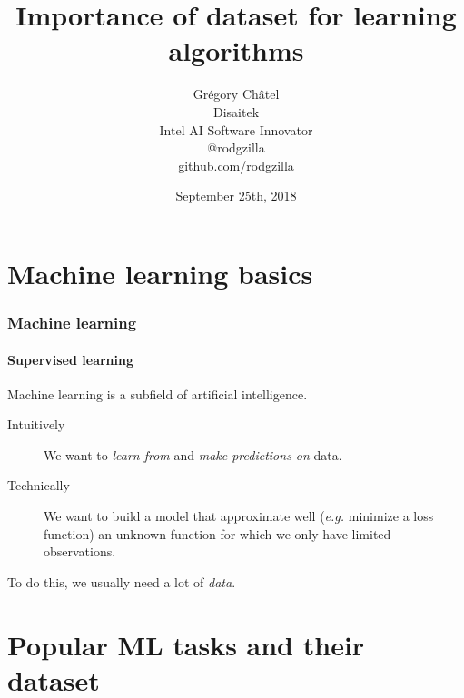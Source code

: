 \documentclass[9pt]{beamer}
\title{Importance of dataset for learning algorithms}
\author[G. Châtel]{Grégory Châtel\\\vspace{0.3cm}Disaitek\\Intel AI Software Innovator\\\vspace{0.3cm}@rodgzilla\\github.com/rodgzilla}
\date{September 25th, 2018}
\begin{document}
\begin{frame}

  \maketitle

\end{frame}

\begin{frame}

  \tableofcontents

\end{frame}

\section{Machine learning basics}

\begin{frame}

  \frametitle{Machine learning}

  \framesubtitle{Supervised learning}

  Machine learning is a subfield of artificial intelligence.

  \bigskip

  \begin{description}
    \item[Intuitively] We want to \emph{learn from} and \emph{make predictions
    on} data.

    \medskip

    \item[Technically] We want to build a model that approximate well
      (\textit{e.g.} minimize a loss function) an unknown function for
      which we only have limited observations.
  \end{description}

  \bigskip

  To do this, we usually need a lot of \emph{data}.

\end{frame}


\section{Popular ML tasks and their dataset}
\end{document}
